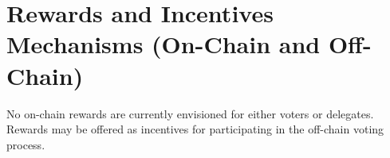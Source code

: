 \section{Rewards and Incentives Mechanisms (On-Chain and Off-Chain)}

No on-chain rewards are currently envisioned for either voters or delegates.   Rewards may be offered as incentives for participating in the off-chain voting process.

